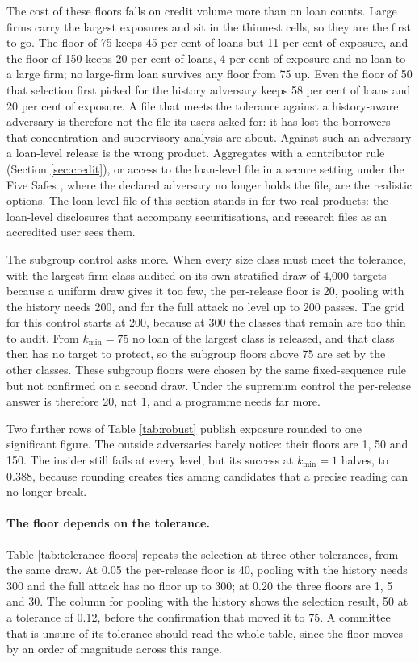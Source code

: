 \documentclass[11pt,a4paper]{article}
\theoremstyle{plain}
\theoremstyle{definition}
\theoremstyle{definition}
\theoremstyle{plain}
\begin{document}
The cost of these floors falls on credit volume more than on loan counts. Large
firms carry the largest exposures and sit in the thinnest cells, so they are the
first to go. The floor of 75 keeps 45 per cent of loans but 11 per cent of
exposure, and the floor of 150 keeps 20 per cent of loans, 4 per cent of exposure
and no loan to a large firm; no large-firm loan survives any floor from 75 up.
Even the floor of 50 that selection first picked for the history adversary keeps
58 per cent of loans and 20 per cent of exposure. A file that meets the
tolerance against a history-aware adversary is therefore not the file its users
asked for: it has lost the borrowers that concentration and supervisory
analysis are about. Against such an adversary a loan-level release is the wrong
product. Aggregates with a contributor rule (Section \ref{sec:credit}), or access
to the loan-level file in a secure setting under the Five Safes
\citep{desai2016}, where the declared adversary no longer holds the file, are the
realistic options. The loan-level file of this section stands in for two real
products: the loan-level disclosures that accompany securitisations, and research
files as an accredited user sees them.

The subgroup control asks more. When every size class must meet the tolerance, with
the largest-firm class audited on its own stratified draw of 4{,}000 targets
because a uniform draw gives it too few, the per-release floor is 20, pooling with
the history needs 200, and for the full attack no level up to 200 passes. The
grid for this control starts at 200, because at 300 the classes that remain are
too thin to audit. From $k_{\min} = 75$ no loan of the largest class is released,
and that class then has no target to protect, so the subgroup floors above 75
are set by the other classes. These subgroup floors were chosen by the same
fixed-sequence rule but not confirmed on a second draw. Under the supremum control
the per-release answer is therefore 20, not 1, and a programme needs far more.

Two further rows of Table \ref{tab:robust} publish exposure rounded to one
significant figure. The outside adversaries barely notice: their floors are 1, 50
and 150. The insider still fails at every level, but its success at $k_{\min} = 1$
halves, to 0.388, because rounding creates ties among candidates that a precise
reading can no longer break.

\paragraph{The floor depends on the tolerance.} Table \ref{tab:tolerance-floors}
repeats the selection at three other tolerances, from the same draw. At 0.05 the
per-release floor is 40, pooling with the history needs 300 and the full attack
has no floor up to 300; at 0.20 the three floors are 1, 5 and 30. The column for
pooling with the history shows the selection result, 50 at a tolerance of 0.12,
before the confirmation that moved it to 75. A committee that is unsure of its
tolerance should read the whole table, since the floor moves by an order of
magnitude across this range.
\end{document}
